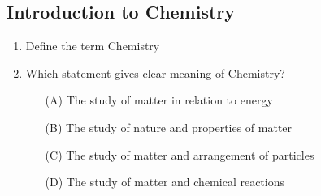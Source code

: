\subsection{Introduction to Chemistry}

\begin{enumerate}
	\item Define the term Chemistry
	
	\item Which statement gives clear meaning of Chemistry?
	\begin{enumerate}[topsep=0ex,itemsep=0ex,partopsep=1ex,parsep=1ex]
		\item[(A)] The study of matter in relation to energy
		\item[(B)] The study of nature and properties of matter
		\item[(C)] The study of matter and arrangement of particles
		\item[(D)] The study of matter and chemical reactions
	\end{enumerate}

\end{enumerate}